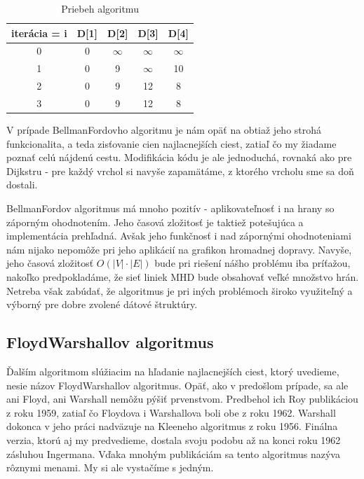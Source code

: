 \begin{table}[H]
  \begin{center}
    \caption{Priebeh algoritmu}
    \label{priebeh_bellman-ford}
    \begin{tabular}{ | c | c | c | c | c | }
      \hline
      iterácia = i & D[1] & D[2] & D[3] & D[4] \\
      \hline
      0 & 0 & $\infty$ & $\infty$ & $\infty$ \\
      1 & 0 & 9 & $\infty$ & 10 \\
      2 & 0 & 9 & 12 & 8 \\
      3 & 0 & 9 & 12 & 8 \\
      \hline
    \end{tabular}
  \end{center}
\end{table}

V prípade Bellman\textendash Fordovho algoritmu je nám opäť na obtiaž jeho strohá funkcionalita, a teda zisťovanie cien najlacnejších ciest, zatiaľ čo my žiadame poznať celú nájdenú cestu. Modifikácia kódu je ale jednoduchá, rovnaká ako pre Dijkstru - pre každý vrchol si navyše zapamätáme, z ktorého vrcholu sme sa doň dostali.\newline

Bellman\textendash Fordov algoritmus má mnoho pozitív - aplikovateľnosť i na hrany so záporným ohodnotením. Jeho časová zložitosť je taktiež potešujúca a implementácia prehľadná. Avšak jeho funkčnosť i nad zápornými ohodnoteniami nám nijako nepomôže pri jeho aplikácií na grafikon hromadnej dopravy. Navyše, jeho časová zložitosť $O(|V|\cdot |E|)$ bude pri riešení nášho problému iba príťažou, nakoľko predpokladáme, že sieť liniek MHD bude obsahovať veľké množstvo hrán. Netreba však zabúdať, že algoritmus je pri iných problémoch široko využiteľný a výborný pre dobre zvolené dátové štruktúry.\newline


\subsection{Floyd\textendash Warshallov algoritmus}

Ďalším algoritmom slúžiacim na hľadanie najlacnejších ciest, ktorý uvedieme, nesie názov Floyd\textendash Warshallov algoritmus. Opäť, ako v predošlom prípade, sa ale ani Floyd, ani Warshall nemôžu pýšiť prvenstvom. Predbehol ich Roy publikáciou z roku 1959, zatiaľ čo Floydova i Warshallova boli obe z roku 1962. Warshall dokonca v jeho práci nadväzuje na Kleeneho algoritmus z roku 1956. Finálna verzia, ktorú aj my predvedieme, dostala svoju podobu až na konci roku 1962 zásluhou Ingermana. Vďaka mnohým publikáciám sa tento algoritmus nazýva rôznymi menami. My si ale vystačíme s jedným.

